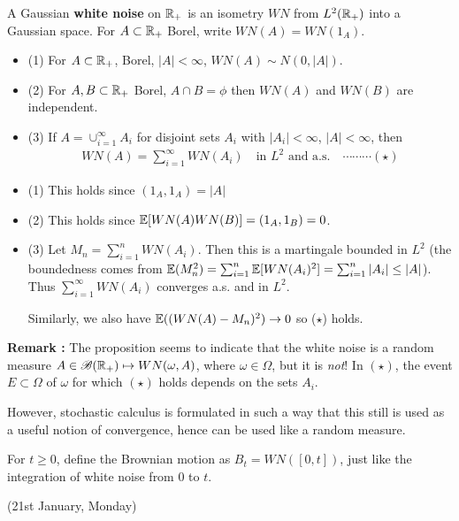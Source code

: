 \documentclass[12pt,a4paper]{article}
\newenvironment{proof}
{\begin{changemargin}{0.5cm}{0.5cm} 
	}%
	{\end{changemargin}
}
\renewenvironment{i}
{\begin{itemize} 
	}%
	{\end{itemize}
}
\newenvironment{p}
{\begin{proof} 
	}%
	{\end{proof}
}
\begin{document}
 A Gaussian \textbf{white noise} on $\mathbb{R}_+$ is an isometry $WN$ from $L^2(\mathbb{R}_+)$ into a Gaussian space. For $A\subset \mathbb{R}_+$ Borel, write $WN(A) = WN(1_A)$.
\s

\prop \begin{i}
\item[(1)] For $A\subset \mathbb{R}_+$, Borel, $|A|<\infty$, $WN(A) \sim N(0, |A|)$.
\item[(2)] For $A, B\subset \mathbb{R}_+$ Borel, $A\cap B =\phi$ then $WN(A)$ and $WN(B)$ are independent.
\item[(3)] If $A = \cup_{i=1}^{\infty} A_i$ for disjoint sets $A_i$ with $|A_i|<\infty$, $|A| <\infty$, then 
\begin{align*}
WN(A) = \sum_{i=1}^{\infty} WN(A_i)\quad \text{in } L^2 \text{ and a.s.} \quad \cdots\cdots\cdots (\star)
\end{align*}
\end{i}
\begin{p}
\pf
\begin{i}
\item[(1)] This holds since $(1_A, 1_A) = |A|$
\item[(2)] This holds since $\mathbb{E}[WN(A)WN(B)] = (1_A, 1_B) = 0$.
\item[(3)] Let $M_n = \sum_{i=1}^n WN(A_i)$. Then this is a martingale bounded in $L^2$ (the boundedness comes from $\mathbb{E}(M_n^2) = \sum_{i=1}^n \mathbb{E} [WN(A_i)^2] = \sum_{i=1}^n |A_i| \leq |A|$). Thus $\sum_{i=1}^{\infty} WN(A_i)$ converges a.s. and in $L^2$.

\quad Similarly, we also have $\mathbb{E}((WN(A)- M_n)^2) \rightarrow 0$ so ($\star$) holds.
\end{i}
\end{p}
\s

\textbf{Remark :} The proposition seems to indicate that the white noise is a random measure $A\in \mathscr{B} (\mathbb{R}_+) \mapsto WN(\omega, A)$, where $\omega \in \Omega$, but it is \emph{not}! In $(\star)$, the event $E\subset \Omega$ of $\omega$ for which $(\star)$ holds depends on the sets $A_i$.

\quad However, stochastic calculus is formulated in such a way that this still is used as a useful notion of convergence, hence can be used like a random measure.
\s

For $t\geq 0$, define the Brownian motion as $B_t = WN([0,t])$, just like the integration of white noise from 0 to $t$.
\s

\newday

(21st January, Monday)
\s
\end{document}
